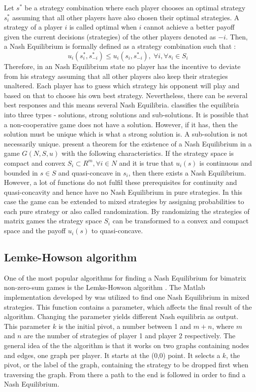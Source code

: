 Let $s^*$ be a strategy combination where each player chooses an optimal strategy $s_i^*$ assuming that all other players have also chosen their optimal strategies. A strategy of a player $i$ is called optimal when $i$ cannot achieve a better payoff given the current decisions (strategies) of the other players denoted as $-i$. Then, a Nash Equilibrium is formally defined as a strategy combination such that \citep{holler2006einfuhrung}:
\begin{equation}
u_i(s_i^*, s_{-i}^*) \leq u_i(s_i,s_{-i}^*), \; \forall i, \forall s_i \in S_i
\end{equation}
Therefore, in an Nash Equilibrium state no player has the incentive to deviate from his strategy assuming that all other players also keep their strategies unaltered. Each player has to guess which strategy his opponent will play and based on that to choose his own best strategy. Nevertheless, there can be several best responses and this means several Nash Equilibria. \citet{nash1950equilibrium} classifies the equilibria into three types - solutions, strong solutions and sub-solutions. It is possible that a non-cooperative game does not have a solution. However, if it has, then the solution must be unique which is what a strong solution is. A sub-solution is not necessarily unique. \citet{holler2006einfuhrung} present a theorem for the existence of a Nash Equilibrium in a game $G(N,S,u)$ with the following characteristics. If the strategy space is compact and convex $S_i \subset R^m, \forall i \in N$ and it is true that $u_i(s)$ is continuous and bounded in $s \in S$ and quasi-concave in $s_i$, then there exists a Nash Equilibrium. However, a lot of functions do not fulfil these prerequisites for continuity and quasi-concavity and hence have no Nash Equilibrium in pure strategies. In this case the game can be extended to mixed strategies by assigning probabilities to each pure strategy or also called randomization. By randomizing the strategies of matrix games the strategy space $S_i$ can be transformed to a convex and compact space and the payoff $u_i(s)$ to quasi-concave.  

\subsection{Lemke-Howson algorithm}
One of the most popular algorithms for finding a Nash Equilibrium for bimatrix non-zero-sum games is the Lemke-Howson algorithm \citep{lemke1964equilibrium}. The Matlab implementation developed by \citet{lemkeHowson2014Matlab} was utilized to find one Nash Equilibrium in mixed strategies. This function contains a parameter, which affects the final result of the algorithm. Changing the parameter yields different Nash equilibria as output. This parameter $k$ is the initial pivot, a number between 1 and $m+n$, where $m$ and $n$ are the number of strategies of player 1 and player 2 respectively. The general idea of the the algorithm is that it works on two graphs containing nodes and edges, one graph per player. It starts at the (0,0) point. It selects a $k$, the pivot, or the label of the graph, containing the strategy to be dropped first when traversing the graph. From there a path to the end is followed in order to find a Nash Equilibrium. 

